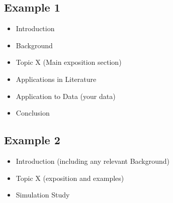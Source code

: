\documentclass[12pt]{article}
\providecommand{\tightlist}{%
  \setlength{\itemsep}{0pt}\setlength{\parskip}{0pt}}
\begin{document}
\hypertarget{example-1}{%
\subsection{Example 1}\label{example-1}}

\begin{itemize}
\tightlist
\item
  Introduction
\item
  Background
\item
  Topic X (Main exposition section)
\item
  Applications in Literature
\item
  Application to Data (your data)
\item
  Conclusion
\end{itemize}

\hypertarget{example-2}{%
\subsection{Example 2}\label{example-2}}

\begin{itemize}
\tightlist
\item
  Introduction (including any relevant Background)
\item
  Topic X (exposition and examples)
\item
  Simulation Study
\end{itemize}



\end{document}
